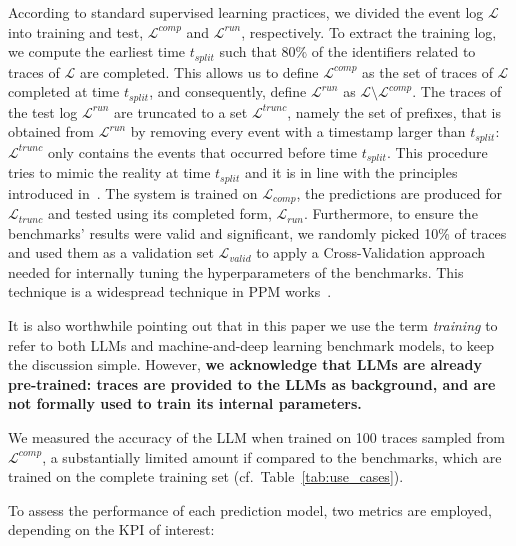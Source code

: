 \documentclass[manuscript,screen,review]{acmart}
\newcommand{\ML}{\mathcal{L}}
\begin{document}
According to standard supervised learning practices, we divided the event log $\ML$ into training and test, $\ML^{comp}$ and $\ML^{run}$, respectively. To extract the training log, we compute the earliest time $t_{split}$ such that $80\%$ of the identifiers related to traces of $\ML$ are completed. This allows us to define $\ML^{comp}$ as the set of traces of $\ML$ completed at time $t_{split}$, and consequently, define $\ML^{run}$ as $\ML \setminus \ML^{comp}$. The traces of the test log $\ML^{run}$ are truncated to a set $\ML^{trunc}$, namely the set of prefixes, that is obtained from $\ML^{run}$ by removing every event with a timestamp larger than $t_{split}$: $\ML^{trunc}$ only contains the events that occurred before time $t_{split}$. This procedure tries to mimic the reality at time $t_{split}$ and it is in line with the principles introduced in~\cite{DBLP:conf/bpm/WeytjensW21a}. The system is trained on $\ML_{comp}$, the predictions are produced for $\ML_{trunc}$ and tested using its completed form, $\ML_{run}$. Furthermore, to ensure the benchmarks' results were valid and significant, we randomly picked 10\% of traces and used them as a validation set $\ML_{valid}$ to apply a Cross-Validation approach needed for internally tuning the hyperparameters of the benchmarks. This technique is a widespread technique in PPM works~\cite{DBLP:conf/coopis/LeoniP24,10.1007/s10618-025-01117-3,PEEPERKORN2024102330}.

It is also worthwhile pointing out that in this paper we use the term \textit{training} to refer to both LLMs and machine-and-deep learning benchmark models, to keep the discussion simple. However, \textbf{we acknowledge that LLMs are already pre-trained: traces are provided to the LLMs as background, and are not formally used to train its internal parameters.}

We measured the accuracy of the LLM when trained on 100 traces sampled from $\ML^{comp}$, a substantially limited amount if compared to the benchmarks, which are trained on the complete training set (cf.\ Table~\ref{tab:use_cases}). 

To assess the performance of each prediction model, two metrics are employed, depending on the KPI of interest:
\end{document}
